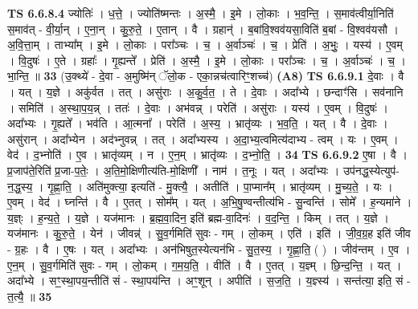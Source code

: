 \documentclass[17pt]{extarticle}
\begin{document}
                  \newline
                                \textbf{ TS 6.6.8.4} \newline
                  ज्योतिः॑ । ध॒त्ते॒ । ज्योति॑ष्मन्तः । अ॒स्मै॒ । इ॒मे । लो॒काः । भ॒व॒न्ति॒ । स॒माव॑त्वीर्या॒निति॑ स॒माव॑त् - वी॒र्या॒न् । ए॒ना॒न् । कु॒रु॒ते॒ । ए॒तान् । वै । ग्रहान्॑ । ब॒बांवि॒श्वव॑यसा॒विति॑ ब॒बां - वि॒श्वव॑यसौ । अ॒वि॒त्ता॒म् । ताभ्या᳚म् । इ॒मे । लो॒काः । परा᳚ञ्चः । च॒ । अ॒र्वाञ्चः॑ । च॒ । प्रेति॑ । अ॒भुः॒ । यस्य॑ । ए॒वम् । वि॒दुषः॑ । ए॒ते । ग्रहाः᳚ । गृ॒ह्यन्ते᳚ । प्रेति॑ । अ॒स्मै॒ । इ॒मे । लो॒काः । परा᳚ञ्चः । च॒ । अ॒र्वाञ्चः॑ । च॒ । भा॒न्ति॒ ॥ \textbf{  33 } \newline
                  \newline
                      (उ॒क्थ्ये॑ - दे॒वा - अ॒मुष्मि॑न् ॅलो॒क - एका॒न्नच॑त्वारिꣳ॒॒शच्च॑)  \textbf{(A8)} \newline \newline
                                \textbf{ TS 6.6.9.1} \newline
                  दे॒वाः । वै । यत् । य॒ज्ञे । अकु॑र्वत । तत् । असु॑राः । अ॒कु॒र्व॒त॒ । ते । दे॒वाः । अदा᳚भ्ये । छन्दाꣳ॑सि । सव॑नानि । समिति॑ । अ॒स्था॒प॒य॒न्न् । ततः॑ । दे॒वाः । अभ॑वन्न् । परेति॑ । असु॑राः । यस्य॑ । ए॒वम् । वि॒दुषः॑ । अदा᳚भ्यः । गृ॒ह्यते᳚ । भव॑ति । आ॒त्मना᳚ । परेति॑ । अ॒स्य॒ । भ्रातृ॑व्यः । भ॒व॒ति॒ । यत् । वै । दे॒वाः । असु॑रान् । अदा᳚भ्येन । अद॑भ्नुवन्न् । तत् । अदा᳚भ्यस्य । अ॒दा॒भ्य॒त्वमित्य॑दाभ्य - त्वम् । यः । ए॒वम् । वेद॑ । द॒भ्नोति॑ । ए॒व । भ्रातृ॑व्यम् । न । ए॒न॒म् । भ्रातृ॑व्यः । द॒भ्नो॒ति॒ । \textbf{  34} \newline
                  \newline
                                \textbf{ TS 6.6.9.2} \newline
                  ए॒षा । वै । प्र॒जाप॑ते॒रिति॑ प्र॒जा-प॒तेः॒ । अ॒ति॒मो॒क्षिणीत्य॑ति-मो॒क्षिणी᳚ । नाम॑ । त॒नूः । यत् । अदा᳚भ्यः । उप॑नद्ध॒स्येत्युप॑-न॒द्ध॒स्य॒ । गृ॒ह्णा॒ति॒ । अति॑मुक्त्या॒ इत्यति॑ - मु॒क्त्यै॒ । अतीति॑ । पा॒प्मान᳚म् । भ्रातृ॑व्यम् । मु॒च्य॒ते॒ । यः । ए॒वम् । वेद॑ । घ्नन्ति॑ । वै । ए॒तत् । सोम᳚म् । यत् । अ॒भि॒षु॒ण्वन्तीत्य॑भि - सु॒न्वन्ति॑ । सोमे᳚ । ह॒न्यमा॑ने । य॒ज्ञ्ः । ह॒न्य॒ते॒ । य॒ज्ञे । यज॑मानः । ब्र॒ह्म॒वा॒दिन॒ इति॑ ब्रह्म-वा॒दिनः॑ । व॒द॒न्ति॒ । किम् । तत् । य॒ज्ञे । यज॑मानः । कु॒रु॒ते॒ । येन॑ । जीवन्न्॑ । सु॒व॒र्गमिति॑ सुवः - गम् । लो॒कम् । एति॑ । इति॑ । जी॒व॒ग्र॒ह इति॑ जीव - ग्र॒हः । वै । ए॒षः । यत् । अदा᳚भ्यः । अन॑भिषुत॒स्येत्यन॑भि - सु॒त॒स्य॒ । गृ॒ह्णा॒ति॒ ( ) । जीव॑न्तम् । ए॒व । ए॒न॒म् । सु॒व॒र्गमिति॑ सुवः - गम् । लो॒कम् । ग॒म॒य॒ति॒ । वीति॑ । वै । ए॒तत् । य॒ज्ञ्म् । छि॒न्द॒न्ति॒ । यत् । अदा᳚भ्ये । सꣳ॒॒स्था॒पय॒न्तीति॑ सं - स्था॒पय॑न्ति । अꣳ॒॒शून् । अपीति॑ । स॒ज॒ति॒ । य॒ज्ञ्स्य॑ । सन्त॑त्या॒ इति॒ सं - त॒त्यै॒ ॥ \textbf{  35} \newline
\end{document}
